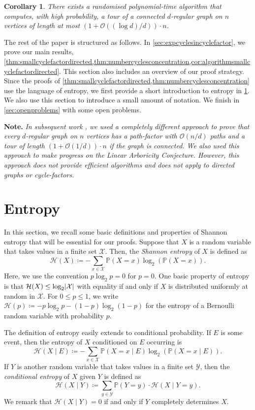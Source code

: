 \documentclass[11pt]{article}
\theoremstyle{plain}
\newtheorem{corollary}[theorem]{Corollary}
\theoremstyle{definition}
\newcommand{\pr}{\mathbb{P}}
\newcommand{\ent}{\mathcal{H}}
\newcommand{\cO}{\mathcal O}
\newcommand{\X}{\mathcal X}
\newcommand{\Y}{\mathcal Y}
\newcommand{\logt}{\log_2}
\DeclarePairedDelimiter{\abs}{\lvert}{\rvert}
\begin{document}
\begin{corollary}\label{cor:smalltour}
    There exists a randomised polynomial-time algorithm that computes, with high probability, a tour of a connected $d$-regular graph on $n$ vertices of length at most $(1+\cO((\log d)/d)) \cdot n$.
\end{corollary}

The rest of the paper is structured as follows. In \cref{sec:expcyclesincyclefactor}, we prove our main results, \cref{thm:smallcyclefactordirected,thm:numbercyclesconcentration,cor:algorithmsmallcyclefactordirected}. This section also includes an overview of our proof strategy. Since the proofs of \cref{thm:smallcyclefactordirected,thm:numbercyclesconcentration} use the language of entropy, we first provide a short introduction to entropy in \cref{sec:prelims}. We also use this section to introduce a small amount of notation. We finish in \cref{sec:openproblems} with some open problems.

\textbf{Note.} \emph{In subsequent work \cite{christoph2025lineararboricity}, we used a completely different approach to prove that every $d$-regular graph on $n$ vertices has a path-factor with $\cO(n/d)$ paths and a tour of length $(1 + \cO(1/d)) \cdot n$ if the graph is connected. We also used this approach to make progress on the Linear Arboricity Conjecture. However, this approach does not provide efficient algorithms and does not apply to directed graphs or cycle-factors.}

\section{Entropy}\label{sec:prelims}

In this section, we recall some basic definitions and properties of Shannon entropy that will be essential for our proofs. Suppose that $X$ is a random variable that takes values in a finite set $\X$. Then, the \emph{Shannon entropy} of $X$ is defined as
\[
    \ent(X) \coloneqq - \sum_{x \in \X} \pr(X = x) \logt(\pr(X = x)).
\]
Here, we use the convention $p \logt p = 0$ for $p = 0$. One basic property of entropy is that $\ent(X) \le \logt \abs{\X}$ with equality if and only if $X$ is distributed uniformly at random in $\X$. For $0 \le p \le 1$, we write $\ent(p) \coloneqq - p \logt p - (1-p) \logt(1-p)$ for the entropy of a Bernoulli random variable with probability $p$.

The definition of entropy easily extends to conditional probability. If $E$ is some event, then the entropy of $X$ conditioned on $E$ occurring is
\[
    \ent(X \mid E) \coloneqq - \sum_{x \in \X} \pr(X = x \mid E) \logt(\pr(X = x \mid E)).
\]
If $Y$ is another random variable that takes values in a finite set $\Y$, then the \emph{conditional entropy} of $X$ given $Y$ is defined as
\[
    \ent(X \mid Y) \coloneqq \sum_{y \in \Y} \pr(Y = y) \cdot \ent(X \mid Y = y).
\]
We remark that $\ent(X \mid Y) = 0$ if and only if $Y$ completely determines $X$.
\end{document}
